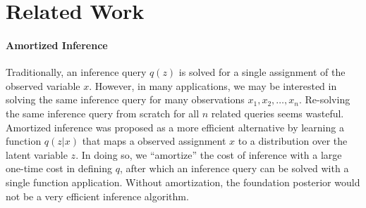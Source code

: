 \section{Related Work}
\label{sec:related}


\paragraph{Amortized Inference} Traditionally, an inference query $q(z)$ is solved for a single assignment of the observed variable $x$. However, in many applications, we may be interested in solving the same inference query for many observations $x_1, x_2, \ldots, x_n$. Re-solving the same inference query from scratch for all $n$ related queries seems wasteful. Amortized inference \cite{gershman2014amortized,stuhlmuller2013learning} was proposed as a more efficient alternative by learning a function $q(z|x)$ that maps a observed assignment $x$ to a distribution over the latent variable $z$. In doing so, we ``amortize'' the cost of inference with a large one-time cost in defining $q$, after which an inference query can be solved with a single function application. Without amortization, the foundation posterior would not be a very efficient inference algorithm.



